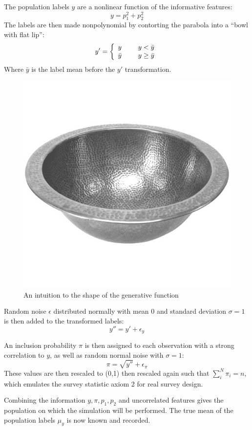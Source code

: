 \documentclass[12pt,twoside]{reedthesis}
\begin{document}
The population labels \(y\) are a nonlinear function of the informative
features: \[
y = p_1^2 + p_2^2
\] The labels are then made nonpolynomial by contorting the parabola
into a ``bowl with flat lip'': \[
y' = \left\{ \begin{array}{cc} 
                y & \hspace{5mm} y<\bar{y} \\
                \bar{y} & \hspace{5mm} y \geq \bar{y} \\
                \end{array} \right.
\] Where \(\bar{y}\) is the label mean before the \(y'\) transformation.
\begin{figure}
\includegraphics[width=0.7\linewidth]{figure/bowl} \caption{An intuition to the shape of the generative function}\label{fig:unnamed-chunk-2}
\end{figure}
Random noise \(\epsilon\) distributed normally with mean \(0\) and
standard deviation \(\sigma = 1\) is then added to the transformed
labels: \[
y'' = y' + \epsilon_y
\]

An inclusion probability \(\pi\) is then assigned to each observation
with a strong correlation to \(y\), as well as random normal noise with
\(\sigma = 1\): \[
\pi = \sqrt{y''} + \epsilon_\pi
\] These values are then rescaled to (0,1) then rescaled again such that
\(\sum_i^N \pi_i = n\), which emulates the survey statistic axiom 2 for
real survey design.

Combining the information \(y,\pi, p_1, p_2\) and uncorrelated features
gives the population on which the simulation will be performed. The true
mean of the population labels \(\mu_y\) is now known and recorded.
\end{document}
